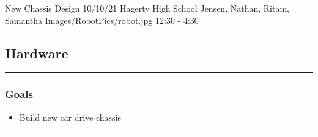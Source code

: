 \insertmeeting 
	{New Chassis Design} 
	{10/10/21}
	{Hagerty High School}
	{Jensen, Nathan, Ritam, Samantha}
	{Images/RobotPics/robot.jpg}
	{12:30 - 4:30}
	
\subsection*{Hardware}
\noindent\hfil\rule{\textwidth}{.4pt}\hfil
\subsubsection*{Goals}
\begin{itemize}
    \item Build new car drive chassis  

\end{itemize} 

\noindent\hfil\rule{\textwidth}{.4pt}\hfil

